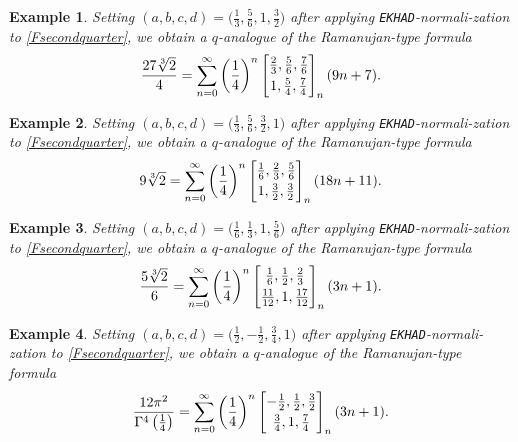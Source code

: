 \documentclass[12pt]{article}
\newtheorem{example}{Example}
\begin{document}
\begin{example}
 Setting $(a, b, c, d) = \big( \frac{1}{3}, \frac{5}{6}, 1, \frac{3}{2} \big)$ after applying {\tt EKHAD}-normali-zation to \eqref{Fsecondquarter}, 
 we obtain a $q$-analogue of the Ramanujan-type formula 
 $$ \frac{27 \sqrt[3]{2} }{4} = \sum_{n = 0}^{\infty} 
 \left( \frac{1}{4} \right)^{n} \left[ \begin{matrix} 
 \frac{2}{3}, \frac{5}{6}, \frac{7}{6} \vspace{1mm} \\ 
 1, \frac{5}{4}, \frac{7}{4} \end{matrix} \right]_{n} (9 n + 7). $$
\end{example} 

\begin{example}
 Setting $(a, b, c, d) = \big( \frac{1}{3}, \frac{5}{6}, \frac{3}{2}, 1 \big)$ 
 after applying {\tt EKHAD}-normali-zation to \eqref{Fsecondquarter}, 
 we obtain a $q$-analogue of the Ramanujan-type formula 
 $$ 9 \sqrt[3]{2} = \sum_{n = 0}^{\infty} 
 \left( \frac{1}{4} \right)^{n} \left[ \begin{matrix} 
 \frac{1}{6}, \frac{2}{3}, \frac{5}{6} \vspace{1mm} \\ 
 1, \frac{3}{2}, \frac{3}{2} \end{matrix} \right]_{n} (18 n + 11). $$
\end{example} 

\begin{example}
 Setting $(a, b, c, d) = \big( \frac{1}{6}, \frac{1}{3}, 1, \frac{5}{6} \big)$ after applying {\tt EKHAD}-normali-zation to \eqref{Fsecondquarter}, 
 we obtain a $q$-analogue of the Ramanujan-type formula 
 $$ \frac{5 \sqrt[3]{2} }{6} = \sum_{n = 0}^{\infty} 
 \left( \frac{1}{4} \right)^{n} \left[ \begin{matrix} 
 \frac{1}{6}, \frac{1}{2}, \frac{2}{3} \vspace{1mm} \\ 
 \frac{11}{12}, 1, \frac{17}{12} \end{matrix} \right]_{n} (3 n + 1). $$
\end{example} 

\begin{example}
 Setting $(a, b, c, d) = \big( \frac{1}{2}, -\frac{1}{2}, \frac{3}{4}, 1 \big)$ 
 after applying {\tt EKHAD}-normali-zation to \eqref{Fsecondquarter}, 
 we obtain a $q$-analogue of the Ramanujan-type formula 
 $$ \frac{12\pi^2}{\Gamma^{4}\left( \frac{1}{4} \right)} = \sum_{n = 0}^{\infty} 
 \left( \frac{1}{4} \right)^{n} \left[ \begin{matrix} 
 -\frac{1}{2}, \frac{1}{2}, \frac{3}{2} \vspace{1mm} \\ 
 \frac{3}{4}, 1, \frac{7}{4} \end{matrix} \right]_{n} (3n+1). $$
\end{example} 
\end{document}
